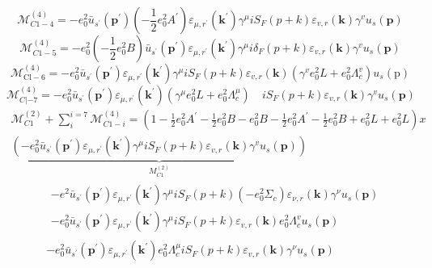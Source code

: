 $$\mathcal{M}_{C 1-4}^{(4)}=-e_{0}^{2} \bar{u}_{s^{\prime}}\left(\mathbf{p}^{\prime}\right)\left(-\frac{1}{2} e_{0}^{2} A^{\prime}\right) \varepsilon_{\mu, r^{\prime}}\left(\mathbf{k}^{\prime}\right) \gamma^{\mu} i S_{F}(p+k) \varepsilon_{v, r}(\mathbf{k}) \gamma^{v} u_{s}(\mathbf{p})$$
$$\mathcal{M}_{C 1-5}^{(4)}=-e_{0}^{2}\left(-\frac{1}{2} e_{0}^{2} B\right) \bar{u}_{s^{\prime}}\left(\mathbf{p}^{\prime}\right)\varepsilon_{\mu, r^{\prime}}\left(\mathbf{k}^{\prime}\right) \gamma^{\mu} i \delta_{F}(p+k) \varepsilon_{v, r}(\mathbf{k}) \gamma^{v} u_{s}(\mathbf{p})$$
$$\mathcal{M}_{\mathrm{Cl}-6}^{(4)}=-e_{0}^{2} \bar{u}_{s^{\prime}}\left(\mathbf{p}^{\prime}\right) \varepsilon_{\mu, r^{\prime}}\left(\mathbf{k}^{\prime}\right) \gamma^{\mu} i S_{F}(p+k) \varepsilon_{v, r}(\mathbf{k})\left(\gamma^{v} e_{0}^{2} L+e_{0}^{2} \Lambda_{c}^{v}\right) u_{s}(\mathrm{p})$$
$$\mathcal{M}_{C |-7}^{(4)}=-e_{0}^{2} \bar{u}_{s^{\prime}}\left(\mathbf{p}^{\prime}\right) \varepsilon_{\mu, r^{\prime}}\left(\mathbf{k}^{\prime}\right)\left(\gamma^{\mu} e_{0}^{2} L+e_{0}^{2} \Lambda_{c}^{\mu}\right) \quad i S_{F}(p+k) \varepsilon_{v, r}(\mathbf{k}) \gamma^{v} u_{s}(\mathbf{p})$$
$$\begin{array}{r}
\mathcal{M}_{C 1}^{(2)}+\sum_{i}^{i=7} \mathcal{M}_{C1-i}^{(4)}=\left(1-\frac{1}{2} e_{0}^{2} A^{\prime}-\frac{1}{2} e_{0}^{2} B-e_{0}^{2} B-\frac{1}{2} e_{0}^{2} A^{\prime}-\frac{1}{2} e_{0}^{2} B+e_{0}^{2} L+e_{0}^{2} L\right) x \\
\underbrace{\left(-e_{0}^{2} \bar{u}_{s^{\prime}}\left(\mathbf{p}^{\prime}\right) \varepsilon_{\mu, r^{\prime}}\left(\mathbf{k}^{\prime}\right) \gamma^{\mu} i S_{F}(p+k) \varepsilon_{v, r}(\mathbf{k}) \gamma^{v} u_{s}(\mathbf{p})\right)}_{
M_{C 1}^{(2)}}
\end{array}$$
$$\begin{aligned}
&\begin{array}{l}
-e^{2} \bar{u}_{s^{\prime}}\left(\mathbf{p}^{\prime}\right) \varepsilon_{\mu, r^{\prime}}\left(\mathbf{k}^{\prime}\right) \gamma^{\mu} i S_{F}(p+k)\left(-e_{0}^{2} \Sigma_{c}\right) \varepsilon_{\nu, r}(\mathbf{k}) \gamma^{\nu} u_{s}(\mathbf{p}) \\
-e_{0}^{2} \bar{u}_{s^{\prime}}\left(\mathbf{p}^{\prime}\right) \varepsilon_{\mu, r^{\prime}}\left(\mathbf{k}^{\prime}\right) \gamma^{\mu} i S_{F}(p+k) \varepsilon_{v, r}(\mathbf{k}) e_{0}^{2} \Lambda_{c}^{v} u_{s}(\mathbf{p})
\end{array}\\
&-e_{0}^{2} \bar{u}_{s^{\prime}}\left(\mathbf{p}^{\prime}\right) \varepsilon_{\mu, r^{\prime}}\left(\mathbf{k}^{\prime}\right) e_{0}^{2} \Lambda_{c}^{\mu} i S_{F}(p+k) \varepsilon_{v, r}(\mathbf{k}) \gamma^{\nu} u_{s}(\mathbf{p})
\end{aligned}$$
